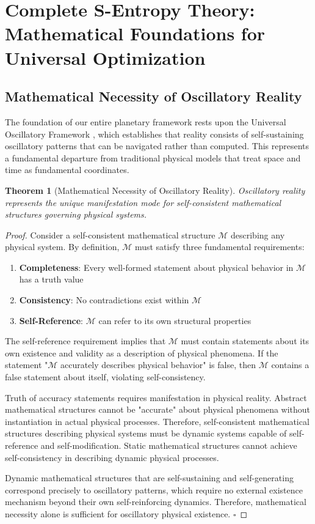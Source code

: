\documentclass[12pt,a4paper]{article}
\newtheorem{theorem}{Theorem}
\begin{document}
\section{Complete S-Entropy Theory: Mathematical Foundations for Universal Optimization}

\subsection{Mathematical Necessity of Oscillatory Reality}

The foundation of our entire planetary framework rests upon the Universal Oscillatory Framework \cite{oscillatory_reality}, which establishes that reality consists of self-sustaining oscillatory patterns that can be navigated rather than computed. This represents a fundamental departure from traditional physical models that treat space and time as fundamental coordinates.

\begin{theorem}[Mathematical Necessity of Oscillatory Reality]
Oscillatory reality represents the unique manifestation mode for self-consistent mathematical structures governing physical systems.
\end{theorem}

\begin{proof}
Consider a self-consistent mathematical structure $\mathcal{M}$ describing any physical system. By definition, $\mathcal{M}$ must satisfy three fundamental requirements:
\begin{enumerate}
\item \textbf{Completeness}: Every well-formed statement about physical behavior in $\mathcal{M}$ has a truth value
\item \textbf{Consistency}: No contradictions exist within $\mathcal{M}$
\item \textbf{Self-Reference}: $\mathcal{M}$ can refer to its own structural properties
\end{enumerate}

The self-reference requirement implies that $\mathcal{M}$ must contain statements about its own existence and validity as a description of physical phenomena. If the statement "$\mathcal{M}$ accurately describes physical behavior" is false, then $\mathcal{M}$ contains a false statement about itself, violating self-consistency.

Truth of accuracy statements requires manifestation in physical reality. Abstract mathematical structures cannot be "accurate" about physical phenomena without instantiation in actual physical processes. Therefore, self-consistent mathematical structures describing physical systems must be dynamic systems capable of self-reference and self-modification. Static mathematical structures cannot achieve self-consistency in describing dynamic physical processes.

Dynamic mathematical structures that are self-sustaining and self-generating correspond precisely to oscillatory patterns, which require no external existence mechanism beyond their own self-reinforcing dynamics. Therefore, mathematical necessity alone is sufficient for oscillatory physical existence. $\square$
\end{proof}
\end{document}
